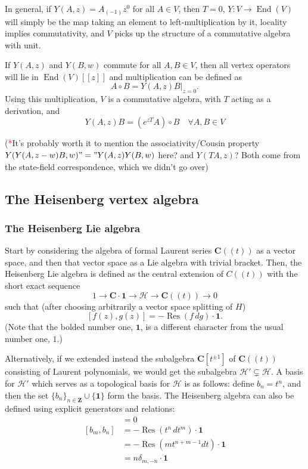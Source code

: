 \documentclass{article}
\newcommand{\CC}{\mathbold{C}}
\newcommand{\ZZ}{\mathbold{Z}}
\newcommand{\Hh}{\mathcal{H}}
\newcommand{\one}{\mathbold{1}}
\newcommand{\tk}{\textcolor{red}{*}}
\DeclareMathOperator{\Res}{Res}
\DeclareMathOperator{\End}{End}
\begin{document}
In general, if $Y(A,z)=A_{(-1)}z^0$ for all $A \in V$, then $T=0$, $Y: V \rightarrow \End(V)$ will simply be the map taking an element to left-multiplication by it, locality implies commutativity, and $V$ picks up the structure of a commutative algebra with unit.

If $Y(A,z)$ and $Y(B,w)$ commute for all $A,B \in V$, then all vertex operators will lie in $\End(V)[[z]]$ and multiplication can be defined as
\[A \circ B = Y(A,z)B|_{z=0}. \]
Using this multiplication, $V$ is a commutative algebra, with $T$ acting as a derivation, and
\[Y(A,z)B=(e^{zT}A) \circ B \quad \forall A,B \in V \]

(\tk It's probably worth it to mention the associativity/Cousin property $Y(Y(A,z-w)B,w)"="Y(A,z)Y(B,w)$ here? and $Y(TA,z)$? Both come from the state-field correspondence, which we didn't go over)

\subsection{The Heisenberg vertex algebra}

\subsubsection{The Heisenberg Lie algebra}


Start by considering the algebra of formal Laurent series $\CC((t))$ as a vector space, and then that vector space as a Lie algebra with trivial bracket.  Then, the Heisenberg Lie algebra is defined as the central extension of $C((t))$ with the short exact sequence
\[1 \rightarrow \CC \cdot \one \rightarrow \Hh \rightarrow \CC((t)) \rightarrow 0 \]
such that (after choosing arbitrarily a vector space splitting of $H$)
\[[f(z),g(z)]=-\Res(f\,dg) \cdot \one. \]
(Note that the bolded number one, $\one$, is a different character from the usual number one, $1$.)  

Alternatively, if we extended instead the subalgebra $\CC[t^{\pm 1}]$ of $\CC((t))$ consisting of Laurent polynomials, we would get the subalgebra $\Hh' \subsetneq \Hh$.  A basis for $\Hh'$ which serves as a topological basis for $\Hh$ is as follows: define $b_n=t^n$, and then the set $\{b_n\}_{n \in \ZZ} \cup \{\one\}$ form the basis.  The Heisenberg algebra can also be defined using explicit generators and relations:
\begin{align}
  [b_n,\one]&=0\\
  [b_m,b_n]&=-\Res(t^n\,dt^m)\cdot\one\\
  &=-\Res(mt^{n+m-1}dt)\cdot\one\\
  &=n\delta_{m,-n}\cdot\one
\end{align}
\end{document}
